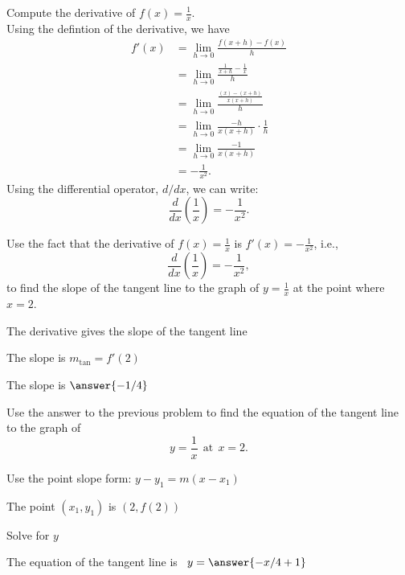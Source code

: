 \documentclass{ximera}
\begin{document}
\begin{example}[example 6]
Compute the derivative of $f(x) = \displaystyle{\frac{1}{x}}$.\\
Using the defintion of the derivative, we have
\begin{align*}
f'(x) &= \lim_{h \to 0} \frac{f(x+h)-f(x)}{h}\\[5pt]
&= \lim_{h \to 0} \frac{\frac{1}{x+h}- \frac{1}{x}}{h}\\[5pt]
&= \lim_{h \to 0} \frac{\frac{(x) - (x+h)}{x(x+h)}}{h} \\[5pt]
&=  \lim_{h \to 0} \frac{-h}{x(x+h)}\cdot \frac{1}{h}\\[5pt]
&= \lim_{h \to 0} \frac{-1}{x(x+h)} \\[5pt]
&= -\frac{1}{x^2}.
\end{align*}
Using the differential operator, $d/dx$, we can write:
\[
 \frac{d}{dx}\left({\frac{1}{x}}\right) = -\frac{1}{x^2}.
\]
\end{example}




\begin{problem} %
Use the fact that the derivative of $f(x) = \frac{1}{x}$ is $f'(x) = -\frac{1}{x^2}$,
i.e., 
\[
\frac{d}{dx}\left(\frac{1}{x}\right) = -\frac{1}{x^2},
\]
to find the slope of the tangent line to the graph of 
$y = \frac{1}{x}$ at the point where $x = 2$.\\
\begin{hint}
The derivative gives the slope of the tangent line
\end{hint}
\begin{hint}
The slope is $m_{\text{tan}} = f'(2)$
\end{hint}
The slope is $\answer{-1/4}$
\end{problem}




\begin{problem} %
Use the answer to the previous problem to find the equation of the tangent line to the graph of 
\[
y = \frac{1}{x} \ \ \text{at} \  \ x=2.
\]
\begin{hint}
Use the point slope form: $y-y_1 = m(x-x_1)$
\end{hint}
\begin{hint}
The point $(x_1,y_1)$ is $(2, f(2))$
\end{hint}
\begin{hint}
Solve for $y$
\end{hint}
The equation of the tangent line is \ $y = \answer{-x/4 + 1}$
\end{problem}
\end{document}
